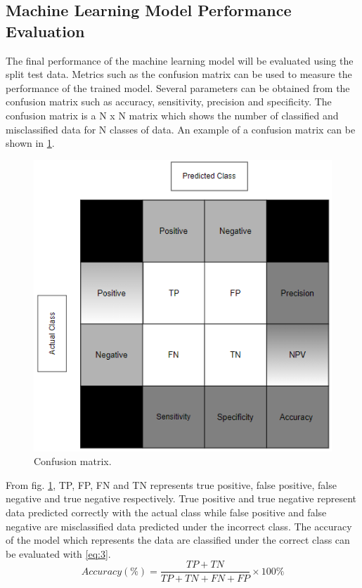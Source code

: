 \subsection{Machine Learning Model Performance Evaluation}
The final performance of the machine learning model will be evaluated using the split test data. Metrics such as the confusion matrix can be used to measure the performance of the trained model. Several parameters can be obtained from the confusion matrix such as accuracy, sensitivity, precision and specificity. The confusion matrix is a N x N matrix which shows the number of classified and misclassified data for N classes of data. An example of a confusion matrix can be shown in \ref{fig_cf}.

\begin{figure} [ht]
    \centering
    \includegraphics[scale=1.0]{pages/Chapter2/Chapter 2 images/Confusion matrix.PNG}
    \caption{Confusion matrix.}
    \label{fig_cf}
\end{figure}

From fig. \ref{fig_cf}, TP, FP, FN and TN represents true positive, false positive, false negative and true negative respectively. True positive and true negative represent data predicted correctly with the actual class while false positive and false negative are misclassified data predicted under the incorrect class.
The accuracy of the model which represents the data are classified under the correct class can be evaluated with \ref{eq:3}.
\begin{equation}
    Accuracy(\%) = \frac{TP + TN}{TP+TN+FN+FP} \times 100\% 
    \label{eq:3}
\end{equation}

